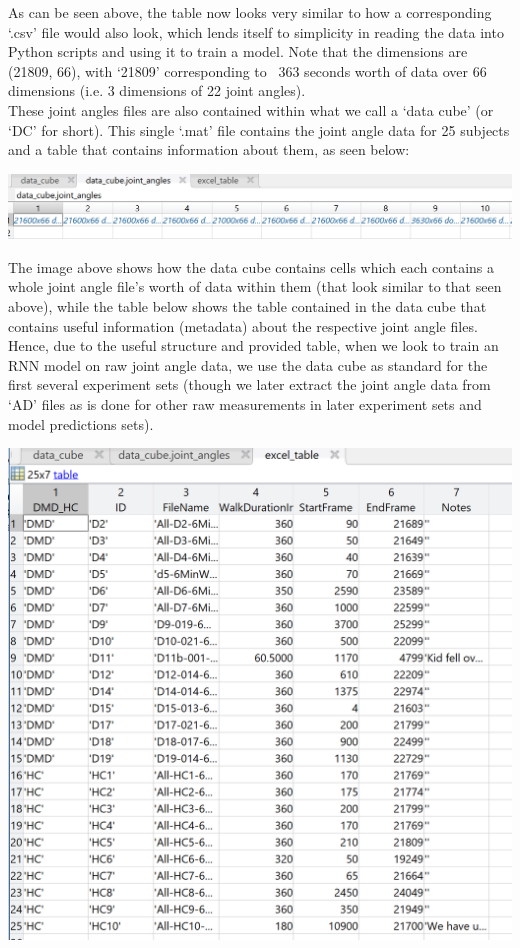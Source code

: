 \documentclass[12pt,twoside]{report}
\begin{document}
\quad As can be seen above, the table now looks very similar to how a corresponding ‘.csv’ file would also look, which lends itself to simplicity in reading the data into Python scripts and using it to train a model. Note that the dimensions are (21809, 66), with ‘21809’ corresponding to ~363 seconds worth of data over 66 dimensions (i.e. 3 dimensions of 22 joint angles).\\

\quad These joint angles files are also contained within what we call a ‘data cube’ (or ‘DC’ for short). This single ‘.mat’ file contains the joint angle data for 25 subjects and a table that contains information about them, as seen below:

\begin{center}
\includegraphics[scale=0.25]{project_figures/fig8_4}
\end{center}

\quad The image above shows how the data cube contains cells which each contains a whole joint angle file’s worth of data within them (that look similar to that seen above), while the table below shows the table contained in the data cube that contains useful information (metadata) about the respective joint angle files. Hence, due to the useful structure and provided table, when we look to train an RNN model on raw joint angle data, we use the data cube as standard for the first several experiment sets (though we later extract the joint angle data from ‘AD’ files as is done for other raw measurements in later experiment sets and model predictions sets).

\begin{center}
\includegraphics[scale=0.25]{project_figures/fig8_5}
\end{center}
\end{document}
